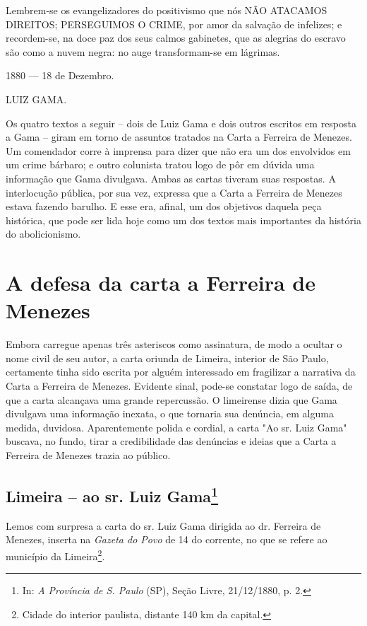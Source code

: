 {Lembrem-se os evangelizadores do positivismo que nós NÃO ATACAMOS
DIREITOS; PERSEGUIMOS O CRIME, por amor da salvação de infelizes; e
recordem-se, na doce paz dos seus calmos gabinetes, que as alegrias do
escravo são como a nuvem negra: no auge transformam-se em lágrimas.

1880 --- 18 de Dezembro.

LUIZ GAMA.

\pagebreak
\mbox{}\vfill
\thispagestyle{empty}

{\small\noindent
Os quatro textos a seguir -- dois de Luiz Gama e dois outros
escritos em resposta a Gama -- giram em torno de assuntos tratados na
Carta a Ferreira de Menezes. Um comendador corre à imprensa para dizer
que não era um dos envolvidos em um crime bárbaro; e outro colunista
tratou logo de pôr em dúvida uma informação que Gama divulgava. Ambas as
cartas tiveram suas respostas. A interlocução pública, por sua vez,
expressa que a Carta a Ferreira de Menezes estava fazendo barulho. E
esse era, afinal, um dos objetivos daquela peça histórica, que pode ser
lida hoje como um dos textos mais importantes da história do
abolicionismo.}

\part{A defesa da carta a Ferreira de Menezes}

\pagebreak
\mbox{}\vfill
\thispagestyle{empty}

{\small\noindent
Embora carregue apenas três asteriscos como assinatura, de modo a
ocultar o nome civil de seu autor, a carta oriunda de Limeira, interior
de São Paulo, certamente tinha sido escrita por alguém interessado em
fragilizar a narrativa da Carta a Ferreira de Menezes. Evidente sinal,
pode-se constatar logo de saída, de que a carta alcançava uma grande
repercussão. O limeirense dizia que Gama divulgava uma informação
inexata, o que tornaria sua denúncia, em alguma medida, duvidosa.
Aparentemente polida e cordial, a carta "Ao sr. Luiz Gama" buscava, no
fundo, tirar a credibilidade das denúncias e ideias que a Carta a
Ferreira de Menezes trazia ao público. }

\chapter{Limeira -- ao sr. Luiz Gama\footnote[*]{In: \emph{A Província de S. Paulo} (SP), Seção Livre, 21/12/1880, p. 2.}}


Lemos com surpresa a carta do sr. Luiz Gama dirigida ao dr. Ferreira de
Menezes, inserta na \emph{Gazeta do Povo} de 14 do corrente, no que se
refere ao município da Limeira\footnote{Cidade do interior paulista,
  distante 140 km da capital.}.

}
